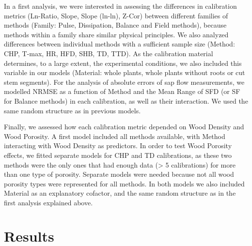 \documentclass[11pt,twoside]{reedthesis}
\begin{document}
In a first analysis, we were interested in assessing the differences in
calibration metrics (Ln-Ratio, Slope, Slope (ln-ln), Z-Cor) between
different families of methods (Family: Pulse, Dissipation, Balance and
Field methods), because methods within a family share similar physical
principles. We also analyzed differences between individual methods with
a sufficient sample size (Method: CHP, T-max, HR, HFD, SHB, TD, TTD). As
the calibration material determines, to a large extent, the experimental
conditions, we also included this variable in our models (Material:
whole plants, whole plants without roots or cut stem segments). For the
analysis of absolute errors of sap flow measurements, we modelled NRMSE
as a function of Method and the Mean Range of SFD (or SF for Balance
methods) in each calibration, as well as their interaction. We used the
same random structure as in previous models.\par 

Finally, we assessed how each calibration metric depended on Wood
Density and Wood Porosity. A first model included all methods available,
with Method interacting with Wood Density as predictors. In order to
test Wood Porosity effects, we fitted separate models for CHP and TD
calibrations, as these two methods were the only ones that had enough
data (\textgreater{} 5 calibrations) for more than one type of porosity.
Separate models were needed because not all wood porosity types were
represented for all methods. In both models we also included Material as
an explanatory cofactor, and the same random structure as in the first
analysis explained above.\par

\section{Results}\label{results}
\end{document}
